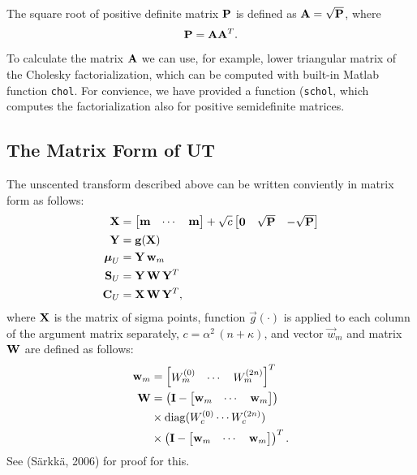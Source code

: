 The square root of positive definite matrix $\mathbf{P}$ is defined as
$\mathbf{A} = \sqrt{\mathbf{P}}$, where
%
\begin{equation}
%
\mat{P} = \mat{A} \mat{A}^T.
%
\end{equation}
%
To calculate the matrix $\mathbf{A}$ we can use, for example, lower
triangular matrix of the Cholesky factorialization, which can be
computed with built-in Matlab function \texttt{chol}. For convience,
we have provided a function (\texttt{schol}, which computes the factorialization also for
positive semidefinite matrices.


\subsection{The Matrix Form of UT}

The unscented transform described above can be written conviently in
matrix form as follows:
%
\begin{align} \mathbf{X} &=
      \begin{bmatrix} \mathbf{m} & \cdots & \mathbf{m} \end{bmatrix} +
\sqrt{c}
      \begin{bmatrix} \mathbf{0} & \sqrt{\mathbf{P}} & -\sqrt{\mathbf{P}}
      \end{bmatrix} \label{eq:ut_x1} \\ \mathbf{Y} &= \mathbf{g}(\mathbf{X})
\label{eq:ukf_x2} \\ \boldsymbol{\mu}_U &= \mathbf{Y} \, \mathbf{w}_m \label{eq:ut_mu}
\\ \mathbf{S}_U &= \mathbf{Y} \, \mathbf{W} \, \mathbf{Y}^T \label{eq:ut_s} \\
\mathbf{C}_U &= \mathbf{X} \, \mathbf{W} \, \mathbf{Y}^T, \label{eq:ut_c}
\end{align}
%
where $\mathbf{X}$ is the matrix of sigma points, function
$\vec{g}(\cdot)$ is applied to each column of the argument matrix
separately, $c = \alpha^2 \, (n + \kappa)$, and vector $\vec{w}_m$ and
matrix $\mathbf{W}$ are defined as follows:
%
\begin{align} \mathbf{w}_m &= \begin{bmatrix} W^{(0)}_m & \cdots &
W^{(2n)}_m
   \end{bmatrix}^T \label{eq:vec_wm} \\ \mathbf{W} &= \left(\mathbf{I} -
     \begin{bmatrix} \mathbf{w}_m & \cdots & \mathbf{w}_m
     \end{bmatrix} \right) \, \nonumber \\ &\times \operatorname{diag}(W^{(0)}_c
\cdots W^{(2n)}_c) \, \nonumber \\ &\times \left(\mathbf{I} -
     \begin{bmatrix} \mathbf{w}_m & \cdots & \mathbf{w}_m
     \end{bmatrix} \right)^T.
   \label{eq:mat_w}
\end{align}
%
See (Särkkä, 2006) for proof for this.

